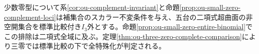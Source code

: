 \documentclass[11pt,a4paper]{ltjsarticle}
\theoremstyle{definition}
\begin{document}
少数零型について系\ref{cor:ou-complement-invariant}と命題\ref{prop:ou-small-zero-complement-loci}は補集合のスカラー不変条件を与え、五台の二項式超曲面の非空開集合を標準比較付き$I_3$外とする。命題\ref{prop:ou-small-zero-entire-binomial}でこの排除は二項式全域に及ぶ。定理\ref{thm:ou-three-zero-complete-comparison}により三零では標準比較の下で全特殊化が判定される。

\appendix



\end{document}
